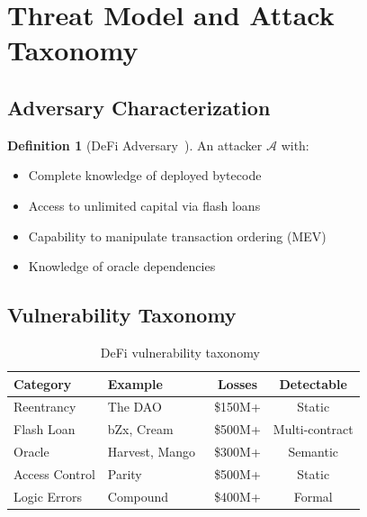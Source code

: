 \documentclass[11pt]{article}
\theoremstyle{definition}
\newtheorem{definition}{Definition}[section]
\theoremstyle{plain}
\theoremstyle{remark}
\begin{document}
\section{Threat Model and Attack Taxonomy}
\label{sec:threats}

\subsection{Adversary Characterization}

\begin{definition}[DeFi Adversary~\cite{zhou2023sok}]
An attacker $\mathcal{A}$ with:
\begin{itemize}
    \item Complete knowledge of deployed bytecode
    \item Access to unlimited capital via flash loans~\cite{qin2021attacking}
    \item Capability to manipulate transaction ordering (MEV)~\cite{daian2020flash}
    \item Knowledge of oracle dependencies~\cite{eskandari2021sok}
\end{itemize}
\end{definition}

\subsection{Vulnerability Taxonomy}

\begin{table}[H]
\centering
\caption{DeFi vulnerability taxonomy~\cite{zhou2023sok, chen2020survey}}
\label{tab:taxonomy}
\begin{tabular}{llcc}
\toprule
\textbf{Category} & \textbf{Example} & \textbf{Losses} & \textbf{Detectable} \\
\midrule
Reentrancy & The DAO~\cite{mehar2019understanding} & \$150M+ & Static \\
Flash Loan & bZx, Cream~\cite{qin2021attacking} & \$500M+ & Multi-contract \\
Oracle & Harvest, Mango~\cite{eskandari2021sok} & \$300M+ & Semantic \\
Access Control & Parity~\cite{atzei2017survey} & \$500M+ & Static \\
Logic Errors & Compound~\cite{zhou2023sok} & \$400M+ & Formal \\
\bottomrule
\end{tabular}
\end{table}
\end{document}
